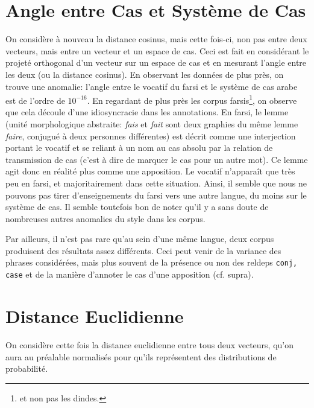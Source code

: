 \documentclass{cours}
\newcommand{\codedir}{Morphosyntactic-Categories_Code}
\begin{document}
    \section{Angle entre Cas et Système de Cas}
    On considère à nouveau la distance cosinus, mais cette fois-ci, non pas entre deux vecteurs, mais entre un vecteur et un espace de cas.
    Ceci est fait en considérant le projeté orthogonal d'un vecteur sur un espace de cas et en mesurant l'angle entre les deux (ou la distance cosinus).
    En observant les données de plus près, on trouve une anomalie: l'angle entre le vocatif du farsi et le système de cas arabe est de l'ordre de $10^{-16}$.
    En regardant de plus près les corpus farsis\footnote{et non pas les dindes.}, on observe que cela découle d'une idiosyncracie dans les annotations.
    En farsi, le lemme (unité morphologique abstraite: \textsl{fais} et \textsl{fait} sont deux graphies du même lemme \textsl{faire}, conjugué à deux personnes différentes)
    est décrit comme une interjection portant le vocatif et se reliant à un nom au cas absolu par la relation de transmission de cas (c'est à dire de marquer le cas pour un autre mot).
    Ce lemme agit donc en réalité plus comme une apposition.
    Le vocatif n'apparaît que très peu en farsi, et majoritairement dans cette situation.
    Ainsi, il semble que nous ne pouvons pas tirer d'enseignements du farsi vers une autre langue, du moins sur le système de cas.
    Il semble toutefois bon de noter qu'il y a sans doute de nombreuses autres anomalies du style dans les corpus.

    Par ailleurs, il n'est pas rare qu'au sein d'une même langue, deux corpus produisent des résultats assez différents. Ceci peut venir de la variance des phrases considérées, mais plus souvent de la présence ou non des reldeps \texttt{conj, case} et de la manière d'annoter le cas d'une apposition (cf. supra).

    \section{Distance Euclidienne}
    On considère cette fois la distance euclidienne entre tous deux vecteurs, qu'on aura au préalable normalisés pour qu'ils représentent des distributions de probabilité.

    
\end{document}
